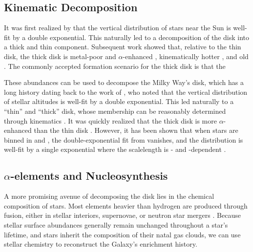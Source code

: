 \subsection{Kinematic Decomposition}\label{intro:kin_decomp}
It was first realized by \citet{1983MNRAS.202.1025G} that the vertical distribution of stars near the Sun is well-fit by a double exponential. This naturally led to a decomposition of the disk into a thick and thin component. Subsequent work showed that, relative to the thin disk, the thick disk is metal-poor and $\alpha$-enhanced \citep{1998A&A...338..161F}, kinematically hotter \citep{2000AJ....119.2843C}, and old \citep{2005A&A...433..185B}. The commonly accepted formation scenario for the thick disk is that the 

These abundances can be used to decompose the Milky Way's disk, which has a long history dating back to the work of \citet{1983MNRAS.202.1025G}, who noted that the vertical distribution of stellar altitudes is well-fit by a double exponential. This led naturally to a ``thin'' and ``thick'' disk, whose membership can be reasonably determined through kinematics \citep[e.g.][]{2003A&A...410..527B}. It was quickly realized that the thick disk is more $\alpha$-enhanced than the thin disk \citep{1996ASPC...92..307G,1998A&A...338..161F}. However, it has been shown that when stars are binned in \FeH{} and \alphaFe{}, the double-exponential fit from \citet{1983MNRAS.202.1025G} vanishes, and the distribution is well-fit by a single exponential where the scalelength is \FeH{}- and \alphaFe{}-dependent \citep{2012ApJ...751..131B}.

\subsection{\texorpdfstring{$\alpha$}{α}-elements and Nucleosynthesis}
A more promising avenue of decomposing the disk lies in the chemical composition of stars. Most elements heavier than hydrogen are produced through fusion, either in stellar interiors, supernovae, or neutron star mergers \citep[e.g.][]{2023A&ARv..31....1A}. Because stellar surface abundances generally remain unchanged throughout a star's lifetime, and stars inherit the composition of their natal gas clouds, we can use stellar chemistry to reconstruct the Galaxy's enrichment history.

